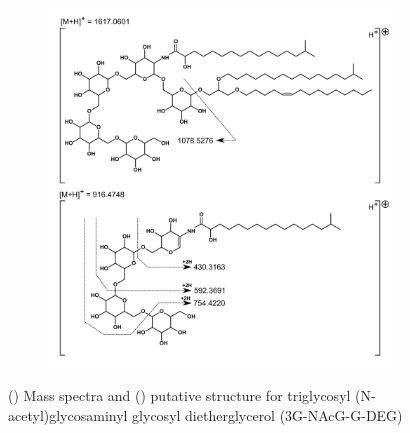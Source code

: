 \begin{figure}[h] \ContinuedFloat
    \begin{subfigure}[b]{1\linewidth}
       \includegraphics[width=\linewidth]{figs_app1/3G-NAcG-G_2}
       \caption{}
        \label{fig:3G-NAcG-G-structure}
    \end{subfigure}
\caption[Mass spectra and putative structure for triglycosyl (N-acetyl)glycosaminyl glycosyl dietherglycerol (3G-NAcG-G-DEG)]{() Mass spectra and () putative structure for triglycosyl (N-acetyl)glycosaminyl glycosyl dietherglycerol (3G-NAcG-G-DEG)}
\label{fig:3G-NAcG-G}
\end{figure}


